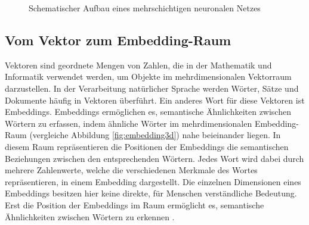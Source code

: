\begin{figure}[H] 
  \centering 
  \caption{Schematischer Aufbau eines mehrschichtigen neuronalen Netzes} 
  \label{fig:neuronales_netz} 
\end{figure}


\subsection{Vom Vektor zum Embedding-Raum}
\label{sec:vom_vektor_zum_embedding}

Vektoren sind geordnete Mengen von Zahlen, die in der Mathematik und Informatik verwendet werden, um Objekte im mehrdimensionalen Vektorraum darzustellen. 
In der Verarbeitung natürlicher Sprache werden Wörter, Sätze und Dokumente häufig in Vektoren überführt.
Ein anderes Wort für diese Vektoren ist Embeddings. Embeddings ermöglichen es, semantische Ähnlichkeiten zwischen Wörtern zu erfassen, 
indem ähnliche Wörter im mehrdimensionalen Embedding-Raum (vergleiche Abbildung \ref{fig:embedding3d}) nahe beieinander liegen.
In diesem Raum repräsentieren die Positionen der Embeddings die semantischen Beziehungen zwischen den entsprechenden Wörtern. 
Jedes Wort wird dabei durch mehrere Zahlenwerte, welche die verschiedenen Merkmale des Wortes repräsentieren, in einem Embedding dargestellt.
Die einzelnen Dimensionen eines Embeddings besitzen hier keine direkte, für Menschen verständliche Bedeutung.
Erst die Position der Embeddings im Raum ermöglicht es, semantische Ähnlichkeiten zwischen Wörtern zu erkennen \parencite{Mikolov2013}.

